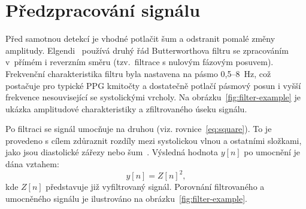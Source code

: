\section{Předzpracování signálu}
\label{sec:preprocess}

Před samotnou detekcí je vhodné potlačit šum a odstranit pomalé změny amplitudy.
Elgendi~\cite{Elgendi2013} používá druhý řád Butterworthova filtru se zpracováním v~přímém i reverzním směru (tzv.~filtrace s nulovým fázovým posuvem).
Frekvenční charakteristika filtru byla nastavena na pásmo 0,5--8~Hz, což postačuje pro typické PPG kmitočty a dostatečně potlačí pásmový posun i vyšší frekvence nesouvisející se systolickými vrcholy.
Na obrázku~\ref{fig:filter-example} je ukázka amplitudové charakteristiky a zfiltrovaného úseku signálu.

Po filtraci se signál umocňuje na druhou (viz. rovnice~\ref{eq:square}).
To je provedeno s cílem zdůraznit rozdíly mezi systolickou vlnou a ostatními složkami, jako jsou diastolické zářezy nebo šum~\cite{Elgendi2013}.
Výsledná hodnota $y[n]$ po umocnění je dána vztahem:
\begin{equation}
	y[n] = Z[n]^2,
	\label{eq:square}
\end{equation}
kde $Z[n]$ představuje již vyfiltrovaný signál.
Porovnání filtrovaného a umocněného signálu je ilustrováno na obrázku~\ref{fig:filter-example}.

